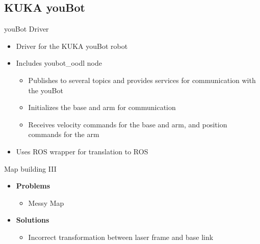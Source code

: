 \subsection{KUKA youBot}
\begin{frame}{youBot Driver}
\begin{itemize}
	\item Driver for the KUKA youBot robot
	\item Includes youbot\_oodl node 
		\begin{itemize}
			\item Publishes to several topics and provides services for communication with the youBot
			\item Initializes the base and arm for communication
			\item Receives velocity commands for the base and arm, and position commands for the arm 
		
		\end{itemize}
	\item Uses ROS wrapper for translation to ROS
\end{itemize}

  
\end{frame}

\begin{frame}{Map building III}
\begin{itemize}
	\item \textbf{Problems}
		\begin{itemize}
			\item Messy Map
		\end{itemize}
	\item \textbf{Solutions}
		\begin{itemize}
			\item Incorrect transformation between laser frame and base link
		\end{itemize}
\end{itemize}
\end{frame}

